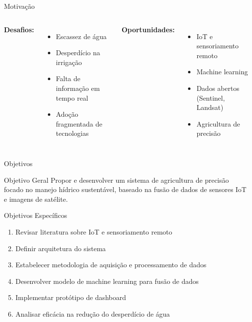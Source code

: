 \documentclass[aspectratio=169]{beamer}
\begin{document}
\begin{frame}{Motivação}
  \begin{columns}
    \textbf{Desafios:}
    \begin{itemize}
      \item Escassez de água
      \item Desperdício na irrigação
      \item Falta de informação em tempo real
      \item Adoção fragmentada de tecnologias
    \end{itemize}
    
    \textbf{Oportunidades:}
    \begin{itemize}
      \item IoT e sensoriamento remoto
      \item Machine learning
      \item Dados abertos (Sentinel, Landsat)
      \item Agricultura de precisão
    \end{itemize}
  \end{columns}
\end{frame}

\begin{frame}{Objetivos}
  \begin{block}{Objetivo Geral}
    Propor e desenvolver um sistema de agricultura de precisão focado no manejo hídrico sustentável, baseado na fusão de dados de sensores IoT e imagens de satélite.
  \end{block}
  
  \vspace{0.5cm}
  
  \begin{block}{Objetivos Específicos}
    \begin{enumerate}
      \item Revisar literatura sobre IoT e sensoriamento remoto
      \item Definir arquitetura do sistema
      \item Estabelecer metodologia de aquisição e processamento de dados
      \item Desenvolver modelo de machine learning para fusão de dados
      \item Implementar protótipo de dashboard
      \item Analisar eficácia na redução do desperdício de água
    \end{enumerate}
  \end{block}
\end{frame}
\end{document}

